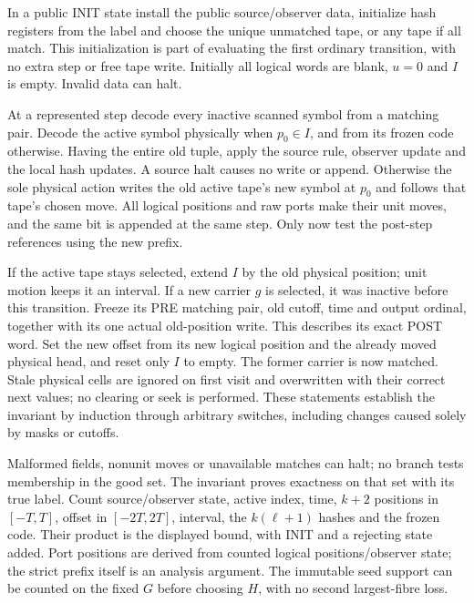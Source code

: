 \begin{informalproof}
In a public INIT state install the public source/observer data, initialize
hash registers from the label and choose the unique unmatched tape, or any
tape if all match. This initialization is part of evaluating the first
ordinary transition, with no extra step or free tape write. Initially all
logical words are blank, $u=0$ and $I$ is empty. Invalid data can halt.

At a represented step decode every inactive scanned symbol from a matching
pair. Decode the active symbol physically when $p_0\in I$, and from its
frozen code otherwise. Having the entire old tuple, apply the source rule,
observer update and the local hash updates. A source halt causes no write
or append. Otherwise the sole physical action writes the old active tape's
new symbol at $p_0$ and follows that tape's chosen move. All logical positions
and raw ports make their unit moves, and the same bit is appended at the
same step. Only now test the post-step references using the new prefix.

If the active tape stays selected, extend $I$ by the old physical position;
unit motion keeps it an interval. If a new carrier $g$ is selected, it was
inactive before this transition. Freeze its PRE matching pair, old cutoff,
time and output ordinal, together with its one actual old-position write.
This describes its exact POST word. Set the new offset from its new logical
position and the already moved physical head, and reset only $I$ to empty.
The former carrier is now matched. Stale physical cells are ignored on first
visit and overwritten with their correct next values; no clearing or seek
is performed. These statements establish the invariant by induction through
arbitrary switches, including changes caused solely by masks or cutoffs.

Malformed fields, nonunit moves or unavailable matches can halt; no branch
tests membership in the good set. The invariant proves exactness on that
set with its true label. Count source/observer state, active index, time,
$k+2$ positions in $[-T,T]$, offset in $[-2T,2T]$, interval, the
$k(\ell+1)$ hashes and the frozen code. Their product is the displayed
bound, with INIT and a rejecting state added. Port positions are derived
from counted logical positions/observer state; the strict prefix itself is
an analysis argument. The immutable seed support can be counted on the fixed
$G$ before choosing $H$, with no second largest-fibre loss.
\end{informalproof}

